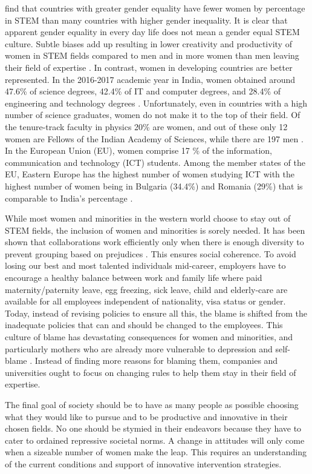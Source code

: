 \documentclass[utf8]{frontiersSCNS} %
\begin{document}
\cite{stoet2018gender} find that countries with greater gender equality have fewer women by percentage in STEM than many countries with higher gender inequality. It is clear that apparent gender equality in every day life does not mean a gender equal STEM culture.  Subtle biases add up resulting in lower creativity and productivity of women in STEM fields compared to  men and in more women than men leaving their field of expertise \citep{2018Report}. In contrast, women in developing countries are better represented. In the 2016-2017 academic year in India, women obtained around 47.6\% of science degrees, 42.4\% of IT and computer degrees, and 28.4\% of engineering and technology degrees \citep{India2017}. Unfortunately, even in countries with a high number of science graduates, women do not make it to the top of their field. Of the tenure-track faculty in physics 20\% are women, and out of these only 12 women are Fellows of the Indian Academy of Sciences, while there are 197 men \citep{WiredIndiaFaculty}. In the European Union (EU), women comprise 17 \% of the information, communication and technology (ICT) students. Among the member states of the EU, Eastern Europe has the highest number of women studying ICT with the highest number of women being in Bulgaria (34.4\%) and Romania (29\%) that is comparable to India's percentage \citep{EuStats}.

While most women and minorities in the western world choose to stay out of STEM fields, the inclusion of women and minorities is sorely needed. It has been shown that collaborations work efficiently only when there is enough diversity to prevent grouping based on prejudices \citep{page2007making}. This ensures social coherence. To avoid losing our best and most talented individuals mid-career, employers have to encourage a healthy balance between work and family life where paid maternity/paternity leave, egg freezing, sick leave, child and elderly-care are available for all employees independent of nationality, visa status or gender. Today, instead of revising policies to ensure all this, the blame is shifted from the inadequate policies that can and should be changed to the employees. This culture of blame has devastating consequences for women and minorities, and particularly mothers who are already more vulnerable to depression and self-blame \citep{hyde1995maternity}. Instead of finding more reasons for blaming them, companies and universities ought to focus on changing rules to help them stay in their field of expertise.

The final goal of society should be to have as many people as possible choosing what they would like to pursue and to be productive and innovative in their chosen fields. No one should be stymied in their endeavors because they have to cater to ordained repressive societal norms. A change in attitudes will only come when a sizeable number of women make the leap. This requires an understanding of the current conditions and support of innovative intervention strategies.
\end{document}
